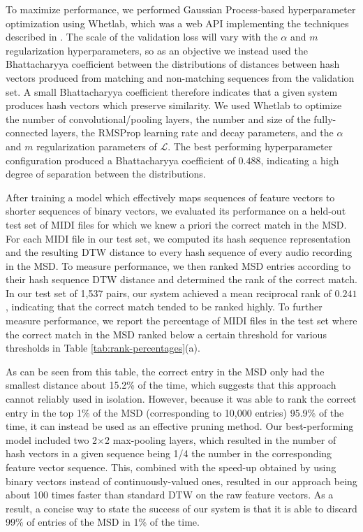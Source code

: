 \documentclass{article} %
\begin{document}
To maximize performance, we performed Gaussian Process-based hyperparameter optimization using Whetlab, which was a web API implementing the techniques described in \cite{snoek2012practical}.
The scale of the validation loss will vary with the $\alpha$ and $m$ regularization hyperparameters, so as an objective we instead used the Bhattacharyya coefficient between the distributions of distances between hash vectors produced from matching and non-matching sequences from the validation set.
A small Bhattacharyya coefficient therefore indicates that a given system produces hash vectors which preserve similarity.
We used Whetlab to optimize the number of convolutional/pooling layers, the number and size of the fully-connected layers, the RMSProp learning rate and decay parameters, and the $\alpha$ and $m$ regularization parameters of $\mathcal{L}$.
The best performing hyperparameter configuration produced a Bhattacharyya coefficient of $0.488$, indicating a high degree of separation between the distributions.

After training a model which effectively maps sequences of feature vectors to shorter sequences of binary vectors, we evaluated its performance on a held-out test set of MIDI files for which we knew a priori the correct match in the MSD.
For each MIDI file in our test set, we computed its hash sequence representation and the resulting DTW distance to every hash sequence of every audio recording in the MSD.
To measure performance, we then ranked MSD entries according to their hash sequence DTW distance and determined the rank of the correct match.
In our test set of 1,537 pairs, our system achieved a mean reciprocal rank of $0.241$, indicating that the correct match tended to be ranked highly.
To further measure performance, we report the percentage of MIDI files in the test set where the correct match in the MSD ranked below a certain threshold for various thresholds in Table \ref{tab:rank-percentages}(a).

As can be seen from this table, the correct entry in the MSD only had the smallest distance about 15.2\% of the time, which suggests that this approach cannot reliably used in isolation.
However, because it was able to rank the correct entry in the top 1\% of the MSD (corresponding to 10,000 entries) 95.9\% of the time, it can instead be used as an effective pruning method.
Our best-performing model included two 2$\times$2 max-pooling layers, which resulted in the number of hash vectors in a given sequence being 1/4 the number in the corresponding feature vector sequence.
This, combined with the speed-up obtained by using binary vectors instead of continuously-valued ones, resulted in our approach being about 100 times faster than standard DTW on the raw feature vectors.
As a result, a concise way to state the success of our system is that it is able to discard 99\% of entries of the MSD in 1\% of the time.
\end{document}
